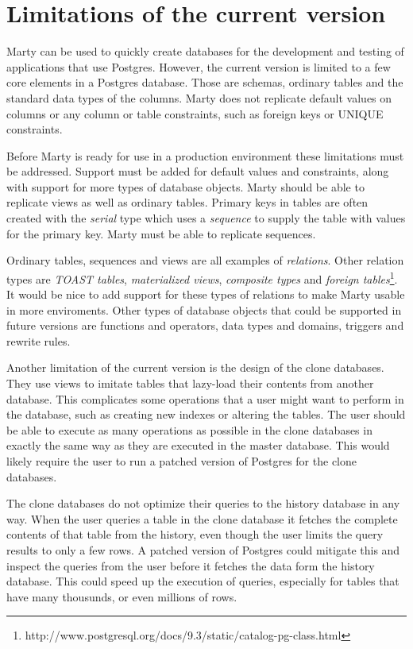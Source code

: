 
\section{Limitations of the current version}
Marty can be used to quickly create databases for the development and testing of applications that use Postgres.
However, the current version is limited to a few core elements in a Postgres database.
Those are schemas, ordinary tables and the standard data types of the columns.
Marty does not replicate default values on columns or any column or table constraints, such as foreign keys or UNIQUE constraints.

Before Marty is ready for use in a production environment these limitations must be addressed.
Support must be added for default values and constraints, along with support for more types of database objects.
Marty should be able to replicate views as well as ordinary tables.
Primary keys in tables are often created with the \textit{serial} type which uses a \textit{sequence} to supply the table with values for the primary key.
Marty must be able to replicate sequences.

Ordinary tables, sequences and views are all examples of \textit{relations}.
Other relation types are \textit{TOAST tables}, \textit{materialized views}, \textit{composite types} and \textit{foreign tables}\footnote{http://www.postgresql.org/docs/9.3/static/catalog-pg-class.html}.
It would be nice to add support for these types of relations to make Marty usable in more enviroments.
Other types of database objects that could be supported in future versions are functions and operators, data types and domains, triggers and rewrite rules.

Another limitation of the current version is the design of the clone databases.
They use views to imitate tables that lazy-load their contents from another database.
This complicates some operations that a user might want to perform in the database, such as creating new indexes or altering the tables.
The user should be able to execute as many operations as possible in the clone databases in exactly the same way as they are executed in the master database.
This would likely require the user to run a patched version of Postgres for the clone databases.

The clone databases do not optimize their queries to the history database in any way.
When the user queries a table in the clone database it fetches the complete contents of that table from the history, even though the user limits the query results to only a few rows.
A patched version of Postgres could mitigate this and inspect the queries from the user before it fetches the data form the history database.
This could speed up the execution of queries, especially for tables that have many thousunds, or even millions of rows.

